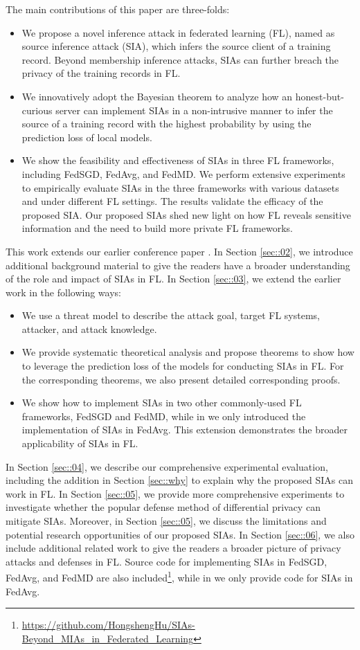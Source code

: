 \documentclass[10pt,journal,compsoc]{IEEEtran}
\begin{document}
The main contributions of this paper are three-folds: 
\begin{itemize}
    \item We propose a novel inference attack in federated learning (FL), named as source inference attack (SIA), which infers the source client of a training record. Beyond membership inference attacks, SIAs can further breach the privacy of the training records in FL. 
    \item We innovatively adopt the Bayesian theorem to analyze how an honest-but-curious server can implement SIAs in a non-intrusive manner to infer the source of a training record with the highest probability by using the prediction loss of local models. 
    \item We show the feasibility and effectiveness of SIAs in three FL frameworks, including FedSGD, FedAvg, and FedMD. We perform extensive experiments to empirically evaluate SIAs in the three frameworks with various datasets and under different FL settings. The results validate the efficacy of the proposed SIA. Our proposed SIAs shed new light on how FL reveals sensitive information and the need to build more private FL frameworks. 
\end{itemize}

{This work extends our earlier conference paper \cite{hu2021source}. In Section \ref{sec::02}, we introduce additional background material to give the readers have a broader understanding of the role and impact of SIAs in FL. In Section \ref{sec::03}, we extend the earlier work  in the following ways:}
\begin{itemize}
    \item {We use a threat model to describe the attack goal, target FL systems, attacker, and attack knowledge. }
    \item {We provide systematic theoretical analysis and propose theorems to show how to leverage the prediction loss of the models for conducting SIAs in FL. For the corresponding theorems, we also present detailed corresponding proofs.}
    \item {We show how to implement SIAs in two other commonly-used FL frameworks, FedSGD and FedMD, while in \cite{hu2021source} we only introduced the implementation of SIAs in FedAvg. This extension demonstrates the broader applicability of SIAs in FL.}
\end{itemize}
    
{In Section \ref{sec::04}, we describe our comprehensive experimental evaluation, including the addition in Section \ref{sec::why} to explain why the proposed SIAs can work in FL. In Section \ref{sec::05}, we provide more comprehensive experiments to investigate whether the popular defense method of differential privacy can mitigate SIAs. Moreover, in Section \ref{sec::05}, we discuss the limitations and potential research opportunities of our proposed SIAs. In Section \ref{sec::06}, we also include additional related work to give the readers a broader picture of privacy attacks and defenses in FL. Source code for implementing SIAs in FedSGD, FedAvg, and FedMD are also included\footnote{\url{https://github.com/HongshengHu/SIAs-Beyond_MIAs_in_Federated_Learning}}, while in \cite{hu2021source} we only provide code for SIAs in FedAvg.}
\end{document}
